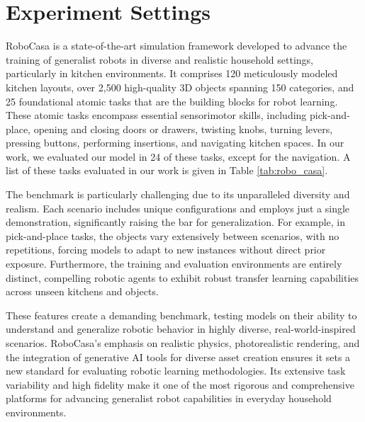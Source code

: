 \section{Experiment Settings}
\label{appendix:exp_settings}

RoboCasa is a state-of-the-art simulation framework developed to advance the training of generalist robots in diverse and realistic household settings, particularly in kitchen environments. It comprises 120 meticulously modeled kitchen layouts, over 2,500 high-quality 3D objects spanning 150 categories, and 25 foundational atomic tasks that are the building blocks for robot learning. These atomic tasks encompass essential sensorimotor skills, including pick-and-place, opening and closing doors or drawers, twisting knobs, turning levers, pressing buttons, performing insertions, and navigating kitchen spaces. In our work, we evaluated our model in 24 of these tasks, except for the navigation. A list of these tasks evaluated in our work is given in Table \ref{tab:robo_casa}.

The benchmark is particularly challenging due to its unparalleled diversity and realism. Each scenario includes unique configurations and employs just a single demonstration, significantly raising the bar for generalization. For example, in pick-and-place tasks, the objects vary extensively between scenarios, with no repetitions, forcing models to adapt to new instances without direct prior exposure. Furthermore, the training and evaluation environments are entirely distinct, compelling robotic agents to exhibit robust transfer learning capabilities across unseen kitchens and objects.

These features create a demanding benchmark, testing models on their ability to understand and generalize robotic behavior in highly diverse, real-world-inspired scenarios. RoboCasa's emphasis on realistic physics, photorealistic rendering, and the integration of generative AI tools for diverse asset creation ensures it sets a new standard for evaluating robotic learning methodologies. Its extensive task variability and high fidelity make it one of the most rigorous and comprehensive platforms for advancing generalist robot capabilities in everyday household environments.




